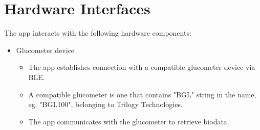 \documentclass[a4paper]{scrreprt}
\begin{document}
\clearpage
\section{Hardware Interfaces}
The app interacts with the following hardware components:
\begin{itemize}
    \item Glucometer device
    \begin{itemize}
        \item The app establishes connection with a compatible glucometer device via BLE.
        \item A compatible glucometer is one that contains "BGL" string in the name, eg. "BGL100", belonging to Trilogy Technologies.
        \item The app communicates with the glucometer to retrieve biodata.
    \end{itemize}
\end{itemize}
\end{document}
